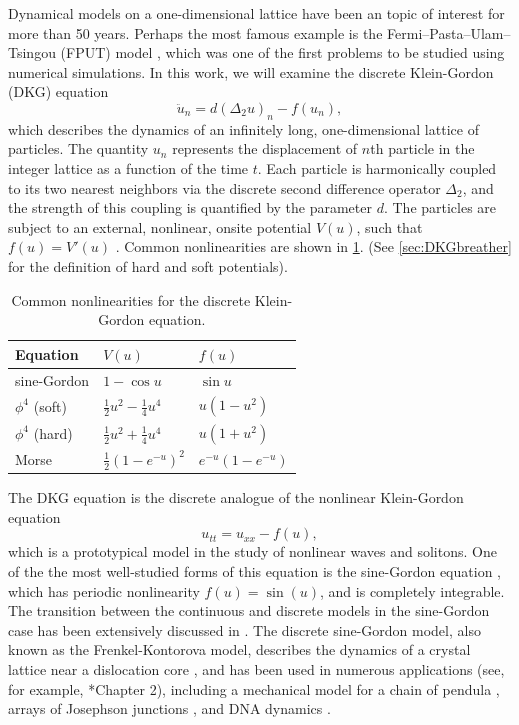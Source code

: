 \documentclass[12pt,reqno]{amsart}
\theoremstyle{definition}
\begin{document}
Dynamical models on a one-dimensional lattice have been an topic of interest for more than 50 years. Perhaps the most famous example is the Fermi–Pasta–Ulam–Tsingou (FPUT) model \cites{FPUT,Zabusuy1965}, which was one of the first problems to be studied using numerical simulations. In this work, we will examine the discrete Klein-Gordon (DKG) equation
\begin{equation*}
\ddot{u}_n = d (\Delta_2 u)_n - f(u_n),
\end{equation*}
which describes the dynamics of an infinitely long, one-dimensional lattice of particles. The quantity $u_n$ represents the displacement of $n$th particle in the integer lattice as a function of the time $t$. Each particle is harmonically coupled to its two nearest neighbors via the discrete second difference operator $\Delta_2$, and the strength of this coupling is quantified by the parameter $d$. The particles are subject to an external, nonlinear, onsite potential $V(u)$, such that $f(u) = V'(u)$ \cite{Karachalios}. Common nonlinearities are shown in \cref{table:V}. (See \cref{sec:DKGbreather} for the definition of hard and soft potentials).

\begin{table}
\begin{tabular}{lll}\toprule
Equation & $V(u)$ & $f(u)$ \\ \midrule
sine-Gordon & $1 - \cos u$ & $\sin u$ \\
$\phi^4$ (soft) & $\frac{1}{2}u^2 - \frac{1}{4}u^4$ & $u(1-u^2)$ \\
$\phi^4$ (hard) & $\frac{1}{2}u^2 + \frac{1}{4}u^4$ & $u(1+u^2)$ \\
Morse & $\frac{1}{2}(1 - e^{-u})^2$ & $e^{-u}(1 - e^{-u})$ \\ \bottomrule
\end{tabular}
\caption{Common nonlinearities for the discrete Klein-Gordon equation.}
\label{table:V}
\end{table}

The DKG equation is the discrete analogue of the nonlinear Klein-Gordon equation
\begin{equation*}
u_{tt} = u_{xx} - f(u),
\end{equation*}
which is a prototypical model in the study of nonlinear waves and solitons. One of the the most well-studied forms of this equation is the sine-Gordon equation \cites{braun2004,SGbook,p4book,kivsharmalomed}, which has periodic nonlinearity $f(u)=\sin(u)$, and is completely integrable. The transition between the continuous and discrete models in the sine-Gordon case has been extensively discussed in \cite{SGchapter}. The discrete sine-Gordon model, also known as the Frenkel-Kontorova model, describes the dynamics of a crystal lattice near a dislocation core \cites{braun1998,braun2004}, and has been used in numerous applications (see, for example, \cite{braun2004}*{Chapter 2}), including a mechanical model for a chain of pendula \cites{Scott1969,english}, arrays of Josephson junctions \cites{Ustinov1992,Floria1998}, and DNA dynamics \cites{Yomosa1983,Yakushevich1998,DeLeo2011}.
\end{document}
